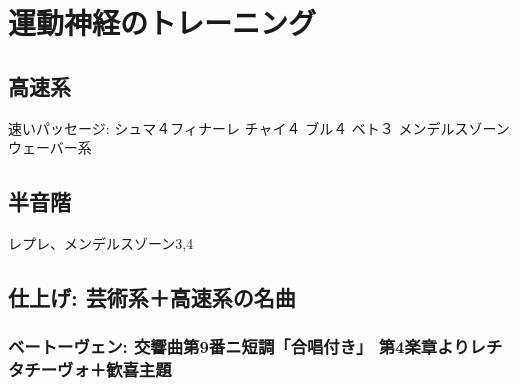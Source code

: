 

\clearpage
\section{運動神経のトレーニング}
\subsection{高速系}
速いパッセージ: シュマ４フィナーレ  チャイ４  ブル４  ベト３  メンデルスゾーン  ウェーバー系  



\subsection{半音階}
レプレ、メンデルスゾーン3,4

\subsection{仕上げ: 芸術系＋高速系の名曲}

\subsubsection*{ベートーヴェン: 交響曲第9番ニ短調「合唱付き」 第4楽章よりレチタチーヴォ＋歓喜主題}


